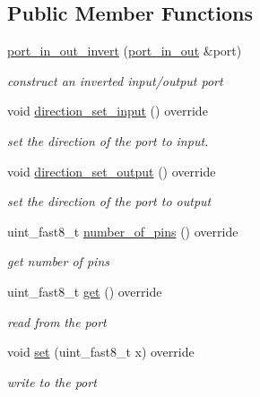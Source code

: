 \subsection*{Public Member Functions}
\begin{DoxyCompactItemize}
\item 
\hyperlink{classhwlib_1_1port__in__out__invert_a973654f691225df539a0d1340c205722}{port\+\_\+in\+\_\+out\+\_\+invert} (\hyperlink{classhwlib_1_1port__in__out}{port\+\_\+in\+\_\+out} \&port)
\begin{DoxyCompactList}\small\item\em construct an inverted input/output port \end{DoxyCompactList}\item 
void \hyperlink{classhwlib_1_1port__in__out__invert_aa9a02e447e2d960e8013300e4a06a35a}{direction\+\_\+set\+\_\+input} () override
\begin{DoxyCompactList}\small\item\em set the direction of the port to input. \end{DoxyCompactList}\item 
void \hyperlink{classhwlib_1_1port__in__out__invert_a038aeaafb573ef871d3608d489977a17}{direction\+\_\+set\+\_\+output} () override
\begin{DoxyCompactList}\small\item\em set the direction of the port to output \end{DoxyCompactList}\item 
uint\+\_\+fast8\+\_\+t \hyperlink{classhwlib_1_1port__in__out__invert_a8f3facb156f79e209a2db42b168edd46}{number\+\_\+of\+\_\+pins} () override
\begin{DoxyCompactList}\small\item\em get number of pins \end{DoxyCompactList}\item 
uint\+\_\+fast8\+\_\+t \hyperlink{classhwlib_1_1port__in__out__invert_ae7fac086fb1203b68376ec77a38e6187}{get} () override
\begin{DoxyCompactList}\small\item\em read from the port \end{DoxyCompactList}\item 
void \hyperlink{classhwlib_1_1port__in__out__invert_ac2d24269e7fd164fa3d32c4ead0bc6c7}{set} (uint\+\_\+fast8\+\_\+t x) override
\begin{DoxyCompactList}\small\item\em write to the port \end{DoxyCompactList}\end{DoxyCompactItemize}



